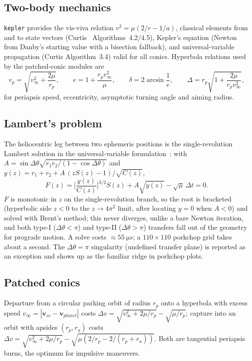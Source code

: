 \documentclass[11pt,a4paper]{article}
\newcommand{\dv}{\Delta v}
\newcommand{\vinf}{v_\infty}
\newcommand{\code}[1]{\texttt{#1}}
\begin{document}
\subsection{Two-body mechanics}
\code{kepler} provides the vis-viva relation $v^2=\mu(2/r-1/a)$, classical elements from and
to state vectors (Curtis~\cite{curtis} Algorithms~4.2/4.5), Kepler's equation (Newton from
Danby's starting value with a bisection fallback), and universal-variable propagation
(Curtis Algorithm~3.4) valid for all conics. Hyperbola relations used by the patched-conic
modules are
\begin{equation}
 v_p=\sqrt{\vinf^2+\frac{2\mu}{r_p}},\qquad e=1+\frac{r_p\vinf^2}{\mu},\qquad
 \delta=2\arcsin\frac1e,\qquad \Delta=r_p\sqrt{1+\frac{2\mu}{r_p\vinf^2}},
\end{equation}
for periapsis speed, eccentricity, asymptotic turning angle and aiming radius.

\subsection{Lambert's problem}
The heliocentric leg between two ephemeris positions is the single-revolution Lambert
solution in the universal-variable formulation~\cite{bmw,curtis}: with
$A=\sin\Delta\theta\sqrt{r_1 r_2/(1-\cos\Delta\theta)}$ and $y(z)=r_1+r_2+A\,(zS(z)-1)/\sqrt{C(z)}$,
\begin{equation}
F(z)=\Big[\frac{y(z)}{C(z)}\Big]^{3/2}S(z)+A\sqrt{y(z)}-\sqrt{\mu}\,\Delta t=0 .
\end{equation}
$F$ is monotonic in $z$ on the single-revolution branch, so the root is bracketed
(hyperbolic side $z<0$ to the $z\to 4\pi^2$ limit, after locating $y=0$ when $A<0$) and
solved with Brent's method; this never diverges, unlike a bare Newton iteration, and both
type-I ($\Delta\theta<\pi$) and type-II ($\Delta\theta>\pi$) transfers fall out of the
geometry for prograde motion. A solve costs $\approx\SI{55}{\micro s}$; a $110\times110$
porkchop grid takes about a second. The $\Delta\theta=\pi$ singularity (undefined transfer
plane) is reported as an exception and shows up as the familiar ridge in porkchop plots.

\subsection{Patched conics}
Departure from a circular parking orbit of radius $r_p$ onto a hyperbola with excess speed
$\vinf=|\bm v_{sc}-\bm v_{planet}|$ costs $\dv=\sqrt{\vinf^2+2\mu/r_p}-\sqrt{\mu/r_p}$;
capture into an orbit with apsides $(r_p,r_a)$ costs $\dv=\sqrt{\vinf^2+2\mu/r_p}-
\sqrt{\mu(2/r_p-2/(r_p+r_a))}$. Both are tangential periapsis burns, the optimum for
impulsive maneuvers.
\end{document}
